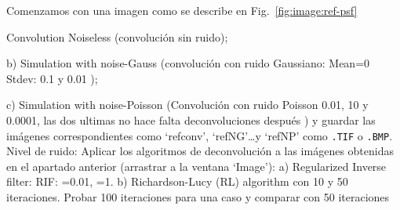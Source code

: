 \documentclass{./packages/optica-article}
\begin{document}
Comenzamos con una imagen como se describe en Fig.~\ref{fig:image:ref-psf}

Convolution Noiseless (convolución sin ruido);

b) Simulation with noise-Gauss (convolución con ruido Gaussiano:
Mean=0
Stdev: 0.1 y 0.01 );

c) Simulation with noise-Poisson (Convolución con ruido Poisson 0.01, 10 y 0.0001, las dos ultimas no
hace falta deconvoluciones después ) y guardar las imágenes correspondientes como  `refconv',  `refNG'\ldots y  `refNP' como \verb|.TIF| o \verb|.BMP|.
Nivel de ruido:
Aplicar los algoritmos de deconvolución a las imágenes obtenidas en el apartado anterior (arrastrar a la ventana `Image'):
a) Regularized Inverse filter:
RIF: =0.01, =1.
b) Richardson-Lucy (RL) algorithm con 10 y 50 iteraciones. Probar 100 iteraciones para una caso y comparar con 50 iteraciones
\end{document}
